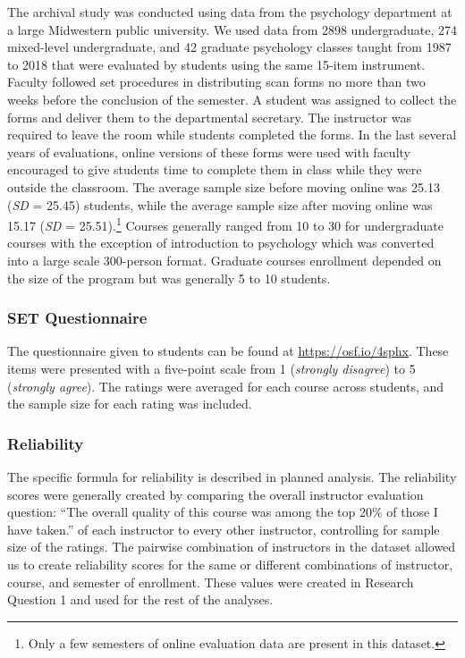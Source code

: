 \documentclass[
  man]{apa7}
\begin{document}
The archival study was conducted using data from the psychology
department at a large Midwestern public university. We used data from
2898
undergraduate, 274
mixed-level undergraduate, and
42 graduate
psychology classes taught from 1987 to 2018 that were evaluated by
students using the same 15-item instrument. Faculty followed set
procedures in distributing scan forms no more than two weeks before the
conclusion of the semester. A student was assigned to collect the forms
and deliver them to the departmental secretary. The instructor was
required to leave the room while students completed the forms. In the
last several years of evaluations, online versions of these forms were
used with faculty encouraged to give students time to complete them in
class while they were outside the classroom. The average sample size
before moving online was 25.13 (\emph{SD} = 25.45) students, while the
average sample size after moving online was 15.17 (\emph{SD} = 25.51).\footnote{Only
  a few semesters of online evaluation data are present in this dataset.}
Courses generally ranged from 10 to 30 for undergraduate courses with
the exception of introduction to psychology which was converted into a
large scale 300-person format. Graduate courses enrollment depended on
the size of the program but was generally 5 to 10 students.

\subsubsection{SET Questionnaire}\label{set-questionnaire}

The questionnaire given to students can be found at
\url{https://osf.io/4sphx}. These items were presented with a five-point
scale from 1 (\emph{strongly disagree}) to 5 (\emph{strongly agree}). The ratings were averaged for each course across students, and the sample size for each rating was included.

\subsubsection{Reliability}\label{reliability-1}

The specific formula for reliability is described in planned analysis. The reliability scores were generally created by comparing the overall instructor evaluation question: ``The overall quality of this course was among the top 20\% of those I have taken.'' of each instructor to every other instructor, controlling for sample size of the ratings. The pairwise combination of instructors in the dataset allowed us to create reliability scores for the same or different combinations of instructor, course, and semester of enrollment. These values were created in Research Question 1 and used for the rest of the analyses.
\end{document}
